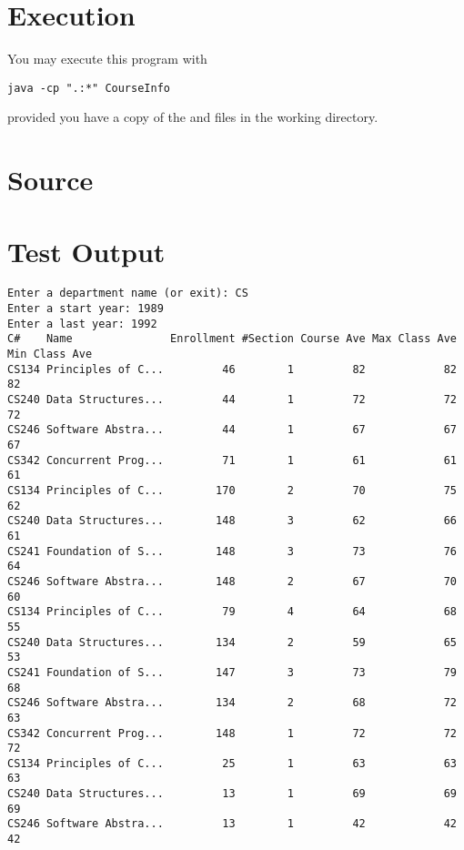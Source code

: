 \documentclass[12pt]{article}
\begin{document}
\section{Execution}
You may execute this program with
\begin{verbatim}
java -cp ".:*" CourseInfo
\end{verbatim}
provided you have a copy of the  and  files in the working directory.

\section{Source}


\section{Test Output}
\begin{verbatim}
Enter a department name (or exit): CS
Enter a start year: 1989
Enter a last year: 1992
C#    Name               Enrollment #Section Course Ave Max Class Ave Min Class Ave
CS134 Principles of C...         46        1         82            82            82
CS240 Data Structures...         44        1         72            72            72
CS246 Software Abstra...         44        1         67            67            67
CS342 Concurrent Prog...         71        1         61            61            61
CS134 Principles of C...        170        2         70            75            62
CS240 Data Structures...        148        3         62            66            61
CS241 Foundation of S...        148        3         73            76            64
CS246 Software Abstra...        148        2         67            70            60
CS134 Principles of C...         79        4         64            68            55
CS240 Data Structures...        134        2         59            65            53
CS241 Foundation of S...        147        3         73            79            68
CS246 Software Abstra...        134        2         68            72            63
CS342 Concurrent Prog...        148        1         72            72            72
CS134 Principles of C...         25        1         63            63            63
CS240 Data Structures...         13        1         69            69            69
CS246 Software Abstra...         13        1         42            42            42
\end{verbatim}
\end{document}
